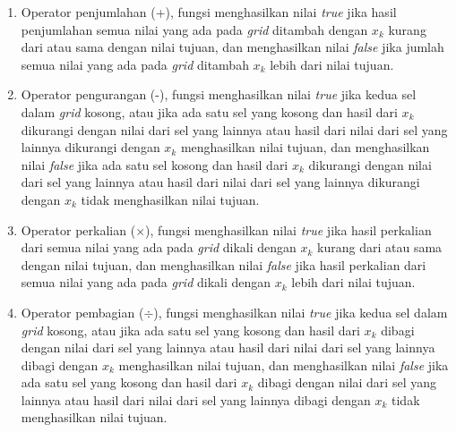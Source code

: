 \begin{enumerate}
\item Operator penjumlahan (+), fungsi menghasilkan nilai \textit{true} jika hasil penjumlahan semua nilai yang ada pada \textit{grid} ditambah dengan \begin{math}x_k\end{math} kurang dari atau sama dengan nilai tujuan, dan menghasilkan nilai \textit{false} jika jumlah semua nilai yang ada pada \textit{grid} ditambah \begin{math}x_k\end{math} lebih dari nilai tujuan.
\item Operator pengurangan (-), fungsi menghasilkan nilai \textit{true} jika kedua sel dalam \textit{grid} kosong, atau jika ada satu sel yang kosong dan hasil dari \begin{math}x_k\end{math} dikurangi dengan nilai dari sel yang lainnya atau hasil dari nilai dari sel yang lainnya dikurangi dengan \begin{math}x_k\end{math} menghasilkan nilai tujuan, dan menghasilkan nilai \textit{false} jika ada satu sel kosong dan hasil dari \begin{math}x_k\end{math} dikurangi dengan nilai dari sel yang lainnya atau hasil dari nilai dari sel yang lainnya dikurangi dengan \begin{math}x_k\end{math} tidak menghasilkan nilai tujuan.
\item Operator perkalian (\begin{math}\times\end{math}), fungsi menghasilkan nilai \textit{true} jika hasil perkalian dari semua nilai yang ada pada \textit{grid} dikali dengan \begin{math}x_k\end{math} kurang dari atau sama dengan nilai tujuan, dan menghasilkan nilai \textit{false} jika hasil perkalian dari semua nilai yang ada pada \textit{grid} dikali dengan \begin{math}x_k\end{math} lebih dari nilai tujuan.
\item Operator pembagian (\begin{math}\div\end{math}), fungsi menghasilkan nilai \textit{true} jika kedua sel dalam \textit{grid} kosong, atau jika ada satu sel yang kosong dan hasil dari \begin{math}x_k\end{math} dibagi dengan nilai dari sel yang lainnya atau hasil dari nilai dari sel yang lainnya dibagi dengan \begin{math}x_k\end{math} menghasilkan nilai tujuan, dan menghasilkan nilai \textit{false} jika ada satu sel yang kosong dan hasil dari \begin{math}x_k\end{math} dibagi dengan nilai dari sel yang lainnya atau hasil dari nilai dari sel yang lainnya dibagi dengan \begin{math}x_k\end{math} tidak menghasilkan nilai tujuan.

\end{enumerate}
